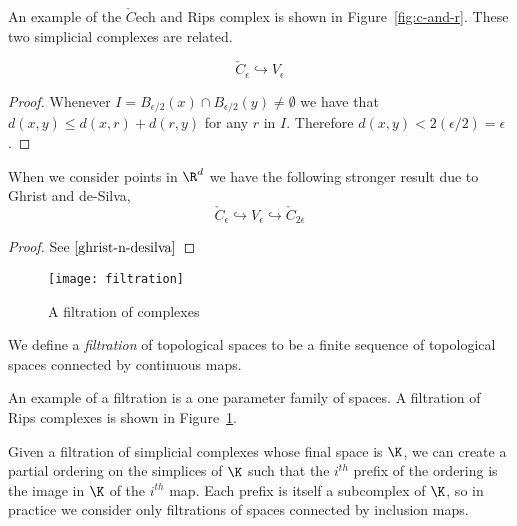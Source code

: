 An example of the $\check{C}$ech and Rips complex is shown in Figure~\ref{fig:c-and-r}. These two simplicial complexes are related.
\begin{theorem}
\[ \check{C}_\epsilon \hookrightarrow V_\epsilon \]
\end{theorem}
\begin{proof}
Whenever $I = B_{\epsilon/2}(x) \cap B_{\epsilon/2}(y) \neq \emptyset$ we have that $d(x,y) \leq d(x,r) + d(r,y)$ for any $r$ in $I$. Therefore $d(x,y) < 2(\epsilon/2) = \epsilon$. 
\end{proof}
\begin{theorem}
When we consider points in $\R^d$ we have the following stronger result due to Ghrist and de-Silva,
\[ \check{C}_\epsilon \hookrightarrow V_\epsilon \hookrightarrow \check{C}_{2\epsilon} \]
\end{theorem}
\begin{proof}
See $\cite{ghrist-n-desilva}$
\end{proof}
\begin{figure}
\centering
\texttt{[image: filtration]}
\caption{A filtration of complexes}
\label{fig:rips-filt}
\end{figure}
\begin{definition}
We define a \emph{filtration} of topological spaces to be a finite sequence of topological spaces connected by
continuous maps.
\end{definition} 
An example of a filtration is a one parameter family of spaces. A filtration of Rips complexes is shown in Figure~\ref{fig:rips-filt}.

Given a filtration of simplicial complexes whose final space is $\K$, we can create a  
partial ordering on the simplices of $\K$ such that the $i^{th}$ prefix of the ordering is the image in $\K$ of the $i^{th}$ map. Each prefix is itself a subcomplex of $\K$, so in practice we consider only filtrations of spaces connected by inclusion maps.

